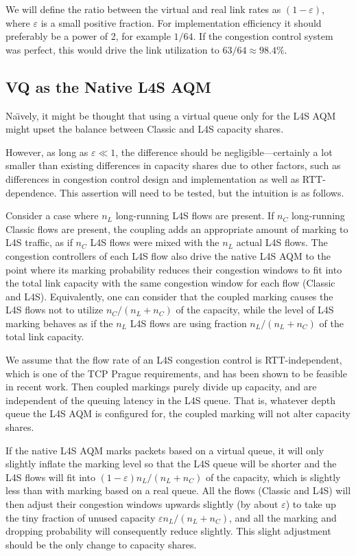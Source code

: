 We will define the ratio between the virtual and real link rates as \((1-\varepsilon)\), where \(\varepsilon\) is a small positive fraction. For implementation efficiency it should preferably be a power of 2, for example \(1/64\). If the congestion control system was perfect, this would drive the link utilization to \(63/64 \approx 98.4\%\).


\subsection{VQ as the Native L4S AQM}\label{l4saqmtr_vq-l4s}

Na\"{\i}vely, it might be thought that using a virtual queue only for the L4S AQM might upset the balance between Classic and L4S capacity shares.

However, as long as \(\varepsilon\ll1\), the difference should be negligible---certainly a lot smaller than existing differences in capacity shares due to other factors, such as differences in congestion control design and implementation as well as RTT-dependence. This assertion will need to be tested, but the intuition is as follows. 

Consider a case where \(n_L\) long-running L4S flows are present. If \(n_C\) long-running Classic flows are present, the coupling adds an appropriate amount of marking to L4S traffic, as if \(n_C\) L4S flows were mixed with the \(n_L\) actual L4S flows. The congestion controllers of each L4S flow also drive the native L4S AQM to the point where its marking probability reduces their congestion windows to fit into the total link capacity with the same congestion window for each flow (Classic and L4S). Equivalently, one can consider that the coupled marking causes the L4S flows not to utilize \(n_C/(n_L+n_C)\) of the capacity, while the level of L4S marking behaves as if the \(n_L\) L4S flows are using fraction \(n_L/(n_L+n_C)\) of the total link capacity.

We assume that the flow rate of an L4S congestion control is RTT-independent, which is one of the TCP Prague requirements, and has been shown to be feasible in recent work. Then coupled markings purely divide up capacity, and are independent of the queuing latency in the L4S queue. That is, whatever depth queue the L4S AQM is configured for, the coupled marking will not alter capacity shares.

If the native L4S AQM marks packets based on a virtual queue, it will only slightly inflate the marking level so that the L4S queue will be shorter and the L4S flows will fit into \((1-\varepsilon)n_L/(n_L+n_C)\) of the capacity, which is slightly less than with marking based on a real queue. All the flows (Classic and L4S) will then adjust their congestion windows upwards slightly (by about \(\varepsilon\)) to take up the tiny fraction of unused capacity  \(\varepsilon n_L/(n_L+n_C)\), and all the marking and dropping probability will consequently reduce slightly. This slight adjustment should be the only change to capacity shares.

